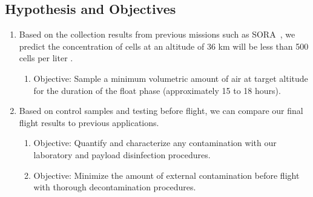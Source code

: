 \subsection{Hypothesis and Objectives}
\label{subsec:Hypothesis and Objectives}
\begin{enumerate}
\item Based on the collection results from previous missions such as SORA~\cite{SORA}, we predict the concentration of cells at an altitude of 36 km will be less than 500 cells per liter \citep{LSU}.
	\begin{enumerate}
	\item Objective: Sample a minimum volumetric amount of air at target altitude for the duration of the float phase (approximately 15 to 18 hours).
	\end{enumerate}
\item Based on control samples and testing before flight, we can compare our final flight results to previous applications.
	\begin{enumerate}
	\item Objective: Quantify and characterize any contamination with our laboratory and payload disinfection procedures.
	\item Objective: Minimize the amount of external contamination before flight with thorough decontamination procedures.
	\end{enumerate}

\end{enumerate}
